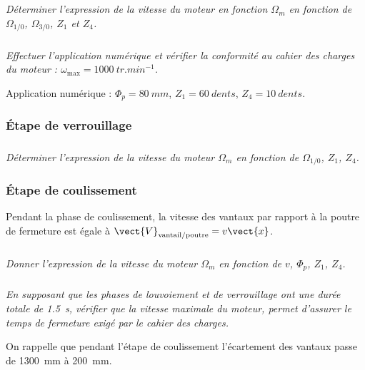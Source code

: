\subparagraph{}
\textit{Déterminer l’expression de la vitesse du moteur en fonction $\Omega_m$ en fonction de $\Omega_{1/0}$, $\Omega_{3/0}$, $Z_1$ et $Z_4$.}
\ifprof
\begin{corrige}
\end{corrige}
\else
\fi

\subparagraph{}
\textit{Effectuer l’application numérique et vérifier la conformité au cahier des charges du moteur : $\omega_{\text{max}}=\SI{1000}{tr.min^{-1}}$. }
\ifprof
\begin{corrige}
\end{corrige}
\else
\fi

Application numérique : $\Phi_p = \SI{80}{mm}$, $Z_1 = \SI{60}{dents}$, $Z_4 = \SI{10}{dents}$.

\subsubsection*{Étape de verrouillage}

\subparagraph{}
\textit{Déterminer l’expression de la vitesse du moteur $\Omega_m$ en fonction de $\Omega_{1/0}$, $Z_1$, $Z_4$.}
\ifprof
\begin{corrige}
\end{corrige}
\else
\fi

\subsubsection*{Étape de coulissement}

Pendant la phase de coulissement, la vitesse des vantaux par rapport à la poutre
de fermeture est égale à $\vect{V}_{\text{vantail}/\text{poutre}}=v\vect{x}$.



\subparagraph{}
\textit{Donner l’expression de la vitesse du moteur $\Omega_m$ en fonction de $v$, $\Phi_p$, $Z_1$, $Z_4$.}
\ifprof
\begin{corrige}
\end{corrige}
\else
\fi

\subparagraph{}
\textit{En supposant que les phases de louvoiement et de verrouillage ont une durée
totale de \SI{1,5}{s}, vérifier que la vitesse maximale du moteur, permet d’assurer le temps de fermeture
exigé par le cahier des charges.}
\ifprof
\begin{corrige}
\end{corrige}
\else
\fi

On rappelle que pendant l’étape de coulissement l’écartement des vantaux
passe de \SI{1300}{mm} à \SI{200}{mm}.

